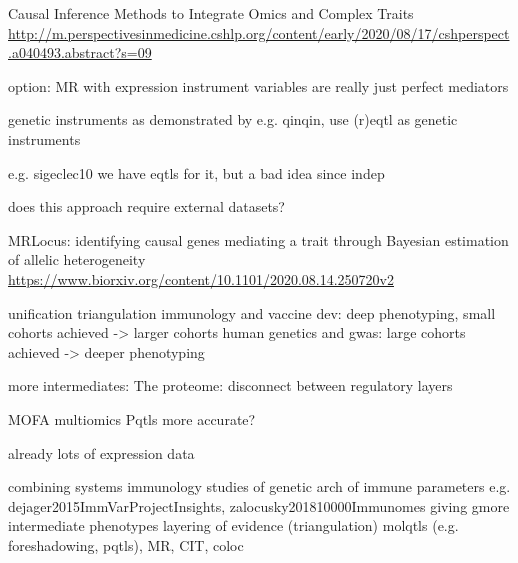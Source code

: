 \begin{outline}
            Causal Inference Methods to Integrate Omics and Complex Traits
            \url{http://m.perspectivesinmedicine.cshlp.org/content/early/2020/08/17/cshperspect.a040493.abstract?s=09}


    option: MR with expression 
        instrument variables are really just perfect mediators

        genetic instruments
        as demonstrated by e.g. qinqin, use (r)eqtl as genetic instruments

        e.g. sigeclec10
        we have eqtls for it, but a bad idea since indep

        does this approach require external datasets?

        MRLocus: identifying causal genes mediating a trait through Bayesian estimation of allelic heterogeneity
        \url{https://www.biorxiv.org/content/10.1101/2020.08.14.250720v2}

unification
    triangulation
    immunology and vaccine dev: deep phenotyping, small cohorts achieved -> larger cohorts
    human genetics and gwas: large cohorts achieved -> deeper phenotyping

    more intermediates:
        The proteome: disconnect between regulatory layers


    MOFA
    multiomics
        Pqtls more accurate?

    already lots of expression data

    combining systems immunology studies of genetic arch of immune parameters
            e.g. dejager2015ImmVarProjectInsights, zalocusky201810000Immunomes
        giving gmore intermediate phenotypes
        layering of evidence (triangulation)
            molqtls (e.g. foreshadowing, pqtls), MR, CIT, coloc


\end{outline}
